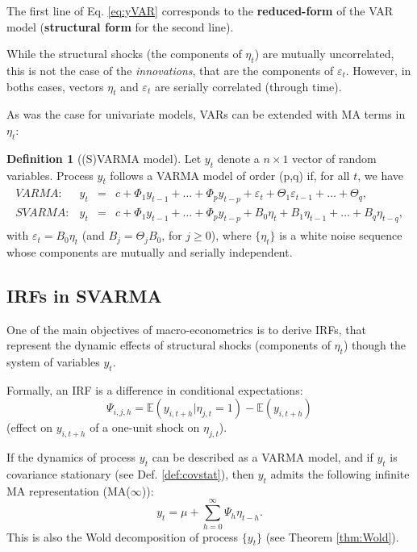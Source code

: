\documentclass[
  12pt,
]{book}
\theoremstyle{definition}
\newtheorem{definition}{Definition}[chapter]
\theoremstyle{definition}
\theoremstyle{definition}
\theoremstyle{definition}
\theoremstyle{remark}
\begin{document}
The first line of Eq. \eqref{eq:yVAR} corresponds to the \textbf{reduced-form} of the VAR model (\textbf{structural form} for the second line).

While the structural shocks (the components of \(\eta_t\)) are mutually uncorrelated, this is not the case of the \emph{innovations}, that are the components of \(\varepsilon_t\). However, in boths cases, vectors \(\eta_t\) and \(\varepsilon_t\) are serially correlated (through time).

As was the case for univariate models, VARs can be extended with MA terms in \(\eta_t\):

\begin{definition}[(S)VARMA model]
\protect\hypertarget{def:SVARMA}{}\label{def:SVARMA}Let \(y_{t}\) denote a \(n \times1\) vector of random variables. Process \(y_{t}\) follows a VARMA model of order (p,q) if, for all \(t\), we have
\begin{eqnarray}
\begin{array}{rllll}
VARMA:& y_t &=& c + \Phi_1 y_{t-1} + \dots + \Phi_p y_{t-p} + \varepsilon_t + \Theta_1\varepsilon_{t-1} + \dots + \Theta_q ,\\
SVARMA:& y_t &=& c + \Phi_1 y_{t-1} + \dots + \Phi_p y_{t-p} + B_0 \eta_t+ B_1 \eta_{t-1} + \dots +  B_q \eta_{t-q},
\end{array}\label{eq:yVARMA}
\end{eqnarray}
with \(\varepsilon_t = B_0\eta_t\) (and \(B_j = \Theta_j B_0\), for \(j \ge 0\)), where \(\{\eta_{t}\}\) is a white noise sequence whose components are mutually and serially independent.
\end{definition}

\hypertarget{IRFSVARMA}{%
\subsection{IRFs in SVARMA}\label{IRFSVARMA}}

One of the main objectives of macro-econometrics is to derive IRFs, that represent the dynamic effects of structural shocks (components of \(\eta_t\)) though the system of variables \(y_t\).

Formally, an IRF is a difference in conditional expectations:
\[
\boxed{\Psi_{i,j,h} = \mathbb{E}(y_{i,t+h}|\eta_{j,t}=1) - \mathbb{E}(y_{i,t+h})}
\]
(effect on \(y_{i,t+h}\) of a one-unit shock on \(\eta_{j,t}\)).

If the dynamics of process \(y_t\) can be described as a VARMA model, and if \(y_t\) is covariance stationary (see Def. \ref{def:covstat}), then \(y_t\) admits the following infinite MA representation (MA(\(\infty\))):
\begin{equation}
y_t = \mu + \sum_{h=0}^\infty \Psi_{h} \eta_{t-h}.\label{eq:InfMA}
\end{equation}
This is also the Wold decomposition of process \(\{y_t\}\) (see Theorem \ref{thm:Wold}).
\end{document}
